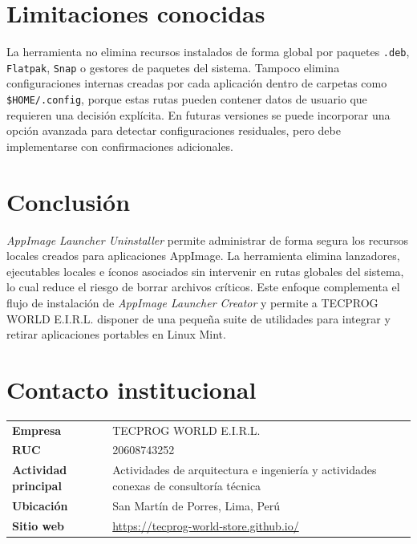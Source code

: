 \documentclass[11pt,a4paper]{article}
\begin{document}
\section{Limitaciones conocidas}

La herramienta no elimina recursos instalados de forma global por paquetes \texttt{.deb}, \texttt{Flatpak}, \texttt{Snap} o gestores de paquetes del sistema. Tampoco elimina configuraciones internas creadas por cada aplicación dentro de carpetas como \texttt{\$HOME/.config}, porque estas rutas pueden contener datos de usuario que requieren una decisión explícita. En futuras versiones se puede incorporar una opción avanzada para detectar configuraciones residuales, pero debe implementarse con confirmaciones adicionales.

\section{Conclusión}

\textit{AppImage Launcher Uninstaller} permite administrar de forma segura los recursos locales creados para aplicaciones AppImage. La herramienta elimina lanzadores, ejecutables locales e íconos asociados sin intervenir en rutas globales del sistema, lo cual reduce el riesgo de borrar archivos críticos. Este enfoque complementa el flujo de instalación de \textit{AppImage Launcher Creator} y permite a TECPROG WORLD E.I.R.L. disponer de una pequeña suite de utilidades para integrar y retirar aplicaciones portables en Linux Mint.

\section*{Contacto institucional}

\begin{longtable}{>{\bfseries}p{5cm}p{10cm}}
Empresa & TECPROG WORLD E.I.R.L. \\
RUC & 20608743252 \\
Actividad principal & Actividades de arquitectura e ingeniería y actividades conexas de consultoría técnica \\
Ubicación & San Martín de Porres, Lima, Perú \\
Sitio web & \url{https://tecprog-world-store.github.io/} \\
\end{longtable}
\end{document}
